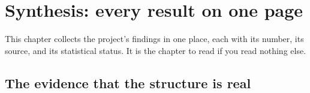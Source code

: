 \section{Synthesis: every result on one page}
\label{ch:synthesis}

This chapter collects the project's findings in one place, each with its number, its
source, and its statistical status. It is the chapter to read if you read nothing else.

\subsection{The evidence that the structure is real}

